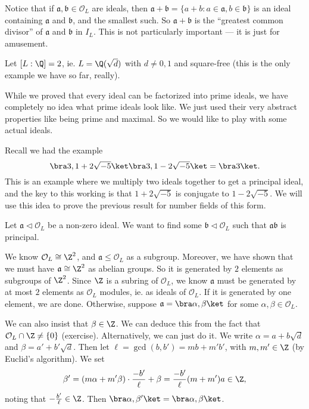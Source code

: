 \documentclass[a4paper]{article}
\begin{document}
Notice that if $\mathfrak{a}, \mathfrak{b} \in \mathcal{O}_L$ are ideals, then $\mathfrak{a} + \mathfrak{b} = \{a + b: a \in \mathfrak{a}, b \in \mathfrak{b}\}$ is an ideal containing $\mathfrak{a}$ and $\mathfrak{b}$, and the smallest such. So $\mathfrak{a} + \mathfrak{b}$ is the ``greatest common divisor'' of $\mathfrak{a}$ and $\mathfrak{b}$ in $I_L$. This is not particularly important --- it is just for amusement.

\begin{eg}
  Let $[L:\Q] = 2$, ie. $L = \Q(\sqrt{d})$ with $d \not= 0, 1$ and square-free (this is the only example we have so far, really).

  While we proved that every ideal can be factorized into prime ideals, we have completely no idea what prime ideals look like. We just used their very abstract properties like being prime and maximal. So we would like to play with some actual ideals.

  Recall we had the example
  \[
    \bra 3, 1 + 2\sqrt{-5}\ket \bra 3, 1 - 2\sqrt{-5}\ket = \bra 3\ket.
  \]
  This is an example where we multiply two ideals together to get a principal ideal, and the key to this working is that $1 + 2\sqrt{-5}$ is conjugate to $1 - 2\sqrt{-5}$. We will use this idea to prove the previous result for number fields of this form.

  Let $\mathfrak{a} \lhd \mathcal{O}_L$ be a non-zero ideal. We want to find some $\mathfrak{b} \lhd \mathcal{O}_L$ such that $\mathfrak{a}\mathfrak{b}$ is principal.

  We know $\mathcal{O}_L \cong \Z^2$, and $\mathfrak{a} \leq \mathcal{O}_L$ as a subgroup. Moreover, we have shown that we must have $\mathfrak{a} \cong \Z^2$ as abelian groups. So it is generated by $2$ elements as subgroups of $\Z^2$. Since $\Z$ is a subring of $\mathcal{O}_L$, we know $\mathfrak{a}$ must be generated by at most $2$ elements as $\mathcal{O}_L$ modules, ie. as ideals of $\mathcal{O}_L$. If it is generated by one element, we are done. Otherwise, suppose $\mathfrak{a} = \bra \alpha, \beta\ket$ for some $\alpha, \beta \in \mathcal{O}_L$.

  We can also insist that $\beta \in \Z$. We can deduce this from the fact that $\mathcal{O}_L \cap \Z \not= \{0\}$ (exercise). Alternatively, we can just do it. We write $\alpha = a + b \sqrt{d}$ and $\beta = a' + b' \sqrt{d}$. Then let $\ell = \gcd(b, b') = mb + m' b'$, with $m, m' \in \Z$ (by Euclid's algorithm). We set
  \[
    \beta' = (m\alpha + m'\beta) \cdot \frac{-b'}{\ell} + \beta = \frac{-b'}{\ell}(m + m')a\in \Z,
  \]
  noting that $-\frac{b'}{\ell} \in \Z$. Then $\bra \alpha, \beta'\ket = \bra \alpha, \beta\ket$.


\end{eg}
\end{document}
